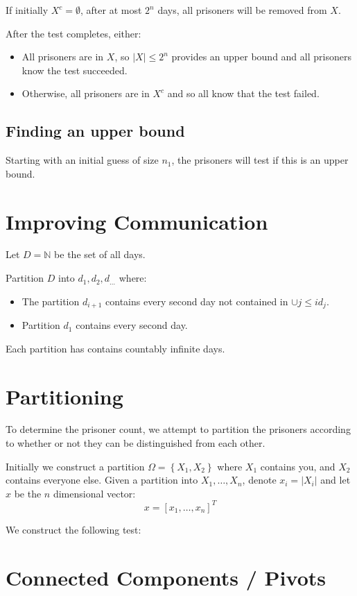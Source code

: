 \documentclass[a4paper, 11pt]{article}
\newcommand{\NN}{\mathbb{N}}
\def\set#1{\left\{ #1 \right\}}
\begin{document}
If initially $X^c=\emptyset$,  after at most $2^n$ days, all prisoners will be removed from $X$.

After the test completes, either: 
\begin{itemize}
	\item 
		All prisoners are in $X$, so $|X|\leq 2^n$ provides an upper bound and all prisoners know the test succeeded. 
	\item 
		Otherwise, all prisoners are in $X^c$ and so all know that the test failed. 
\end{itemize}

\subsection*{Finding an upper bound}
Starting with an initial guess of size $n_1$, the prisoners will test if this is an upper bound. 



\section*{Improving Communication}
Let $D=\NN$ be the set of all days. 

Partition $D$ into $d_1,d_2,d_{\dots}$ where: 

\begin{itemize}
	\item The partition $d_{i+1}$ contains every second day not contained in $\cup{j\leq i} d_j$.
	\item Partition $d_1$ contains every second day.
\end{itemize}

Each partition has contains countably infinite days. 

\section*{Partitioning}
To determine the prisoner count, we attempt to partition the prisoners according to whether or not they can be distinguished from each other. 

Initially we construct a partition $\Omega=\set{X_1,X_2}$ where $X_1$ contains you, and $X_2$ contains everyone else. Given a partition into $X_1,\dots,X_n$, denote $x_i=|X_i|$ and let $x$ be the $n$ dimensional vector: 
\[
	x=\left[ x_1,\dots,x_n \right]^T
\]


We construct the following test: 









\section*{Connected Components / Pivots}
\end{document}
